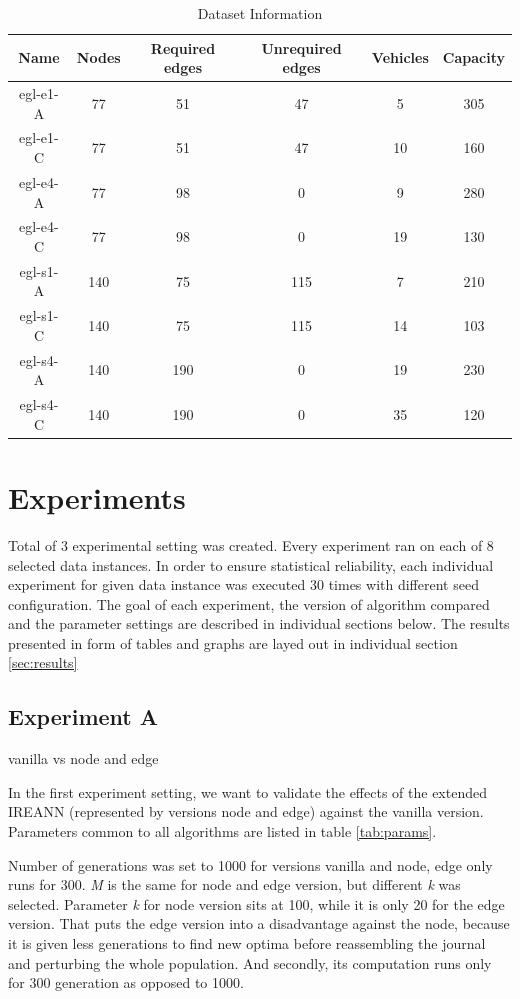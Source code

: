 \documentclass[twoside]{ctuthesis}
\theoremstyle{plain}
\theoremstyle{definition}
\theoremstyle{note}
\begin{document}
\begin{table}[htbp]
	\centering
	\caption{Dataset Information}
	\label{tab:dataset}
	\begin{tabular}{cccccc}
		\textbf{Name} & \textbf{Nodes} & \textbf{Required edges} & \textbf{Unrequired edges} & \textbf{Vehicles} & \textbf{Capacity} \\
		\hline
		egl-e1-A & 77 & 51 & 47 & 5 & 305 \\
		egl-e1-C & 77 & 51 & 47 & 10 & 160 \\
		egl-e4-A & 77 & 98 & 0 & 9 & 280 \\
		egl-e4-C & 77 & 98 & 0 & 19 & 130 \\
		egl-s1-A & 140 & 75 & 115 & 7 & 210 \\
		egl-s1-C & 140 & 75 & 115 & 14 & 103 \\
		egl-s4-A & 140 & 190 & 0 & 19 & 230 \\
		egl-s4-C & 140 & 190 & 0 & 35 & 120 \\
		\hline
	\end{tabular}
\end{table}


\section{Experiments}
\label{sec:expdesc}
Total of 3 experimental setting was created. Every experiment ran on each of 8 selected data instances.
In order to ensure statistical reliability, each individual experiment for given data instance was executed 30 times with different seed configuration.
The goal of each experiment, the version of algorithm compared and the parameter settings are described in individual sections below.
The results presented in form of tables and graphs are layed out in individual section \ref{sec:results}

\subsection{Experiment A}
vanilla vs node and edge


In the first experiment setting, we want to validate the effects of the extended IREANN (represented by versions node and edge) against the vanilla version. Parameters common to all algorithms are listed in table \ref{tab:params}.

Number of generations was set to 1000 for versions vanilla and node, edge only runs for 300. \emph{M} is the same for node and edge version, but different \emph{k} was selected. Parameter \emph{k} for node version sits at 100, while it is only 20 for the edge version. That puts the edge version into a disadvantage against the node, because it is given less generations to find new optima before reassembling the journal and perturbing the whole population. And secondly, its computation runs only for 300 generation as opposed to 1000.
\end{document}
